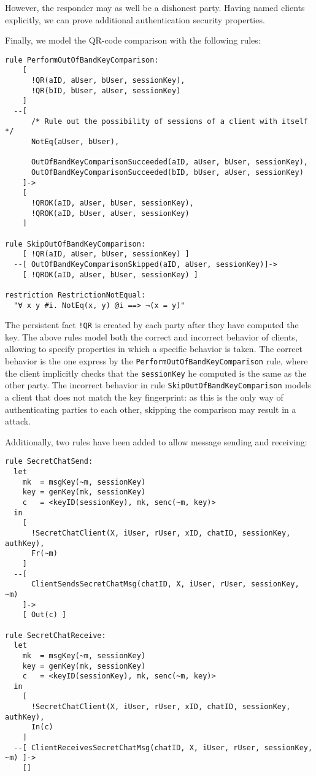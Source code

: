 However, the responder may as well be a dishonest party. Having named clients explicitly, we can prove additional authentication security properties.

Finally, we model the QR-code comparison with the following rules:

\begin{lstlisting}
rule PerformOutOfBandKeyComparison:
    [ 
      !QR(aID, aUser, bUser, sessionKey),
      !QR(bID, bUser, aUser, sessionKey)
    ]
  --[ 
      /* Rule out the possibility of sessions of a client with itself */
      NotEq(aUser, bUser),

      OutOfBandKeyComparisonSucceeded(aID, aUser, bUser, sessionKey),
      OutOfBandKeyComparisonSucceeded(bID, bUser, aUser, sessionKey)
    ]->
    [
      !QROK(aID, aUser, bUser, sessionKey),
      !QROK(aID, bUser, aUser, sessionKey)
    ]

rule SkipOutOfBandKeyComparison:
    [ !QR(aID, aUser, bUser, sessionKey) ]
  --[ OutOfBandKeyComparisonSkipped(aID, aUser, sessionKey)]->
    [ !QROK(aID, aUser, bUser, sessionKey) ]

restriction RestrictionNotEqual:
  "∀ x y #i. NotEq(x, y) @i ==> ¬(x = y)"
\end{lstlisting}

The persistent fact \lstinline{!QR} is created by each party after they have computed the \schat{} key. The above rules model both the correct and incorrect behavior of clients, allowing to specify properties in which a specific behavior is taken. The correct behavior is the one express by the \lstinline{PerformOutOfBandKeyComparison} rule, where the client implicitly checks that the \lstinline{sessionKey} he computed is the same as the other party. The incorrect behavior in rule \lstinline{SkipOutOfBandKeyComparison} models a client that does not match the key fingerprint: as this is the only way of authenticating parties to each other, skipping the comparison may result in a \DiHe{} \mitm{} attack.

Additionally, two rules have been added to allow message sending and receiving:

\begin{lstlisting}
rule SecretChatSend:
  let
    mk  = msgKey(~m, sessionKey)
    key = genKey(mk, sessionKey)
    c   = <keyID(sessionKey), mk, senc(~m, key)>
  in
    [ 
      !SecretChatClient(X, iUser, rUser, xID, chatID, sessionKey, authKey),
      Fr(~m)
    ]
  --[
      ClientSendsSecretChatMsg(chatID, X, iUser, rUser, sessionKey, ~m)
    ]->
    [ Out(c) ]

rule SecretChatReceive:
  let
    mk  = msgKey(~m, sessionKey)
    key = genKey(mk, sessionKey)
    c   = <keyID(sessionKey), mk, senc(~m, key)>
  in
    [
      !SecretChatClient(X, iUser, rUser, xID, chatID, sessionKey, authKey),
      In(c)
    ]
  --[ ClientReceivesSecretChatMsg(chatID, X, iUser, rUser, sessionKey, ~m) ]->
    []
\end{lstlisting}

